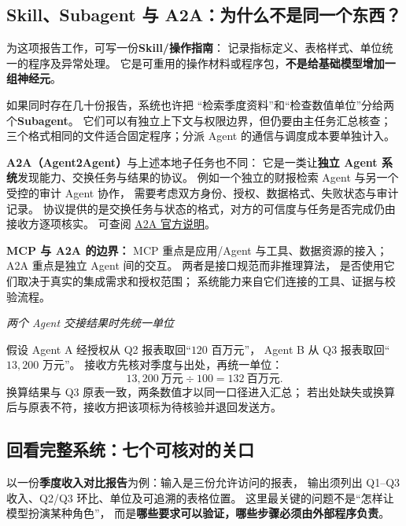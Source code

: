 \subsection{Skill、Subagent 与 A2A：为什么不是同一个东西？}
\label{concept:subagent}
\label{concept:skill}

为这项报告工作，可写一份\textbf{Skill/操作指南}：
记录指标定义、表格样式、单位统一的程序及异常处理。
它是可重用的操作材料或程序包，\textbf{不是给基础模型增加一组神经元}。

如果同时存在几十份报告，系统也许把
“检索季度资料”和“检查数值单位”分给两个\textbf{Subagent}。
它们可以有独立上下文与权限边界，但仍要由主任务汇总核查；
三个格式相同的文件适合固定程序；分派 Agent 的通信与调度成本要单独计入。

\label{concept:a2a}
\textbf{A2A（Agent2Agent）}与上述本地子任务也不同：
它是一类让\textbf{独立 Agent 系统}发现能力、交换任务与结果的协议。
例如一个独立的财报检索 Agent 与另一个受控的审计 Agent 协作，
需要考虑双方身份、授权、数据格式、失败状态与审计记录。
协议提供的是交换任务与状态的格式，对方的可信度与任务是否完成仍由接收方逐项核实。
可查阅 \href{https://a2a-protocol.org/v1.0.0/specification/}{A2A 官方说明}。

\textbf{MCP 与 A2A 的边界：}
MCP 重点是应用/Agent 与工具、数据资源的接入；
A2A 重点是独立 Agent 间的交互。
两者是接口规范而非推理算法，
是否使用它们取决于真实的集成需求和授权范围；
系统能力来自它们连接的工具、证据与校验流程。


\begin{example}[breakable=false]
\noindent\emph{两个 Agent 交接结果时先统一单位}\par
假设 Agent A 经授权从 Q2 报表取回“$120$ 百万元”，
Agent B 从 Q3 报表取回“$13{,}200$ 万元”。
接收方先核对季度与出处，再统一单位：
\[
13{,}200\ \text{万元}\div100=\boxed{132\ \text{百万元}}.
\]
换算结果与 Q3 原表一致，两条数值才以同一口径进入汇总；
若出处缺失或换算后与原表不符，接收方把该项标为待核验并退回发送方。
\end{example}

\subsection{回看完整系统：七个可核对的关口}
\label{sec:agent-seven-gates}

以一份\textbf{季度收入对比报告}为例：输入是三份允许访问的报表，
输出须列出 Q1--Q3 收入、Q2/Q3 环比、单位及可追溯的表格位置。
这里最关键的问题不是“怎样让模型扮演某种角色”，
而是\textbf{哪些要求可以验证，哪些步骤必须由外部程序负责}。

